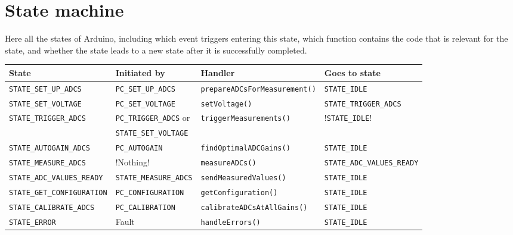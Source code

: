 \documentclass[11pt,a4paper,english]{article}
\begin{document}
\clearpage

\section{State machine}\label{sec:state_machine}
Here all the states of Arduino, including which event triggers entering this state, which function contains the code that is relevant for the state, and whether the state leads to a new state after it is successfully completed.
\begin{center}
\small
\begin{tabular}{llll}\toprule
State					        & Initiated by                 & Handler                            & Goes to state        \\\midrule
\texttt{STATE\_SET\_UP\_ADCS}   & \texttt{PC\_SET\_UP\_ADCS}   & \texttt{prepareADCsForMeasurement()} & \texttt{STATE\_IDLE} \\
\texttt{STATE\_SET\_VOLTAGE}    & \texttt{PC\_SET\_VOLTAGE}    & \texttt{setVoltage()}              & \texttt{STATE\_TRIGGER\_ADCS}\\
\texttt{STATE\_TRIGGER\_ADCS}   & \texttt{PC\_TRIGGER\_ADCS} or & \texttt{triggerMeasurements()}    & !\texttt{STATE\_IDLE}! \\
                                & \texttt{STATE\_SET\_VOLTAGE} &&\\
\texttt{STATE\_AUTOGAIN\_ADCS}  & \texttt{PC\_AUTOGAIN}        & \texttt{findOptimalADCGains()}     & \texttt{STATE\_IDLE} \\
\texttt{STATE\_MEASURE\_ADCS}   & !Nothing! & \texttt{measureADCs()}   & \texttt{STATE\_ADC\_VALUES\_READY}\\
\texttt{STATE\_ADC\_VALUES\_READY} & \texttt{STATE\_MEASURE\_ADCS} & \texttt{sendMeasuredValues()}  & \texttt{STATE\_IDLE}\\
\texttt{STATE\_GET\_CONFIGURATION} & \texttt{PC\_CONFIGURATION}    & \texttt{getConfiguration()}    & \texttt{STATE\_IDLE}\\
\texttt{STATE\_CALIBRATE\_ADCS} & \texttt{PC\_CALIBRATION}     & \texttt{calibrateADCsAtAllGains()} & \texttt{STATE\_IDLE}\\
\texttt{STATE\_ERROR}           & Fault                        & \texttt{handleErrors()}            & \texttt{STATE\_IDLE}\\
\bottomrule
\end{tabular}
\end{center}
\end{document}
